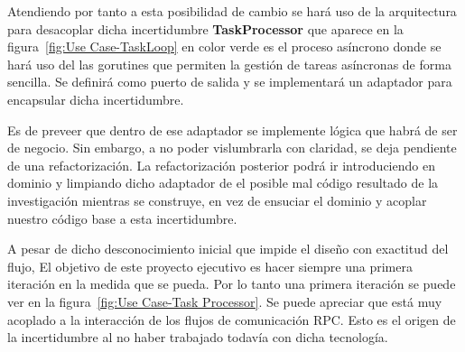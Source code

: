 \begin{itemize}
    Atendiendo por tanto a esta posibilidad de cambio se hará uso de la arquitectura para desacoplar dicha incertidumbre \textbf{TaskProcessor} que aparece en la figura~\cref{fig:Use Case-TaskLoop} en color verde es el proceso asíncrono donde se hará uso del las gorutines que permiten la gestión de tareas asíncronas de forma sencilla.
    Se definirá como puerto de salida y se implementará un adaptador para encapsular dicha incertidumbre.

    Es de preveer que dentro de ese adaptador se implemente lógica que habrá de ser de negocio.
    Sin embargo, a no poder vislumbrarla con claridad, se deja pendiente de una refactorización.
    La refactorización posterior podrá ir introduciendo en dominio y limpiando dicho adaptador de el posible mal código resultado de la investigación mientras se construye, en vez de ensuciar el dominio y acoplar nuestro código base a esta incertidumbre.

    A pesar de dicho desconocimiento inicial que impide el diseño con exactitud del flujo, El objetivo de este proyecto ejecutivo es hacer siempre una primera iteración en la medida que se pueda.
    Por lo tanto una primera iteración se puede ver en la figura~\cref{fig:Use Case-Task Processor}.
    Se puede apreciar que está muy acoplado a la interacción de los flujos de comunicación RPC. Esto es el origen de la incertidumbre al no haber trabajado todavía con dicha tecnología.


\end{itemize}
